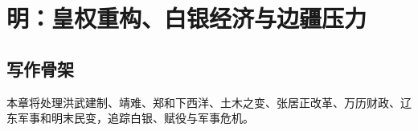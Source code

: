 \chapter{明：皇权重构、白银经济与边疆压力}
\section{写作骨架}
本章将处理洪武建制、靖难、郑和下西洋、土木之变、张居正改革、万历财政、辽东军事和明末民变，追踪白银、赋役与军事危机。
